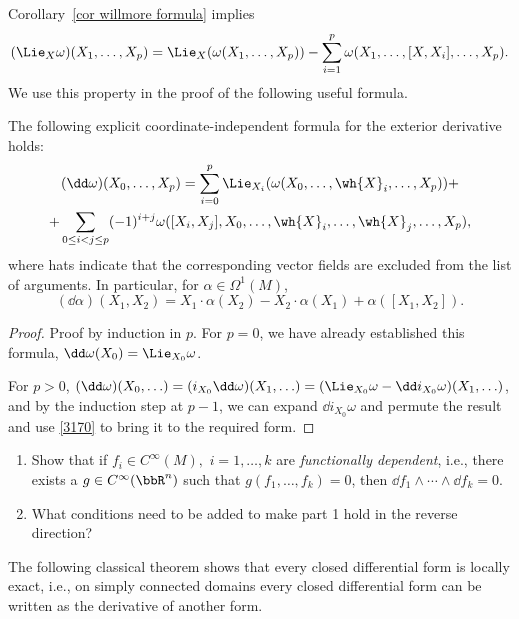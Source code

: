 Corollary~\ref{cor willmore formula} implies
\[(\Lie_X\omega) (X_1,\ldots,X_p)=\Lie_X(\omega(X_1,\ldots,X_p))-\sum_{i=1}^p\omega(X_1,\ldots,[X,X_i],\ldots,X_p).\label{3170}\]
We use this property in the proof of the following useful formula.

\begin{prop}[{{\cite[Prop.~4.1.6]{RS1}}}]\label{prop 4.1.6 RS1}
    The following explicit coordinate-independent formula for the exterior derivative holds:
    \begin{multline}
        (\dd\omega)(X_0,\ldots,X_{p})=\sum_{i=0}^p \Lie_{X_i}(\omega(X_0,\ldots,\wh{X}_i,\ldots,X_p))+\\+\sum_{0\leq i<j\leq p}(-1)^{i+j}\omega([X_i,X_j],X_0,\ldots,\wh{X}_i,\ldots,\wh{X}_j,\ldots,X_p),\label{eq d in terms of Lie}
    \end{multline}
    where hats indicate that the corresponding vector fields are excluded from the list of arguments. In particular, for $\alpha\in\Omega^1(M)$,
    \[(\dd\alpha)(X_1,X_2)=X_1\cdot \alpha(X_2)-X_2\cdot\alpha(X_1)+\alpha ([X_1,X_2]).\label{eq prop 4.1.6}\]
\end{prop}
\begin{proof}
Proof by induction in $p$. For $p=0$, we have already established this formula, $\dd \omega(X_0)=\Lie_{X_0}\omega$.

For $p>0$, $(\dd\omega)(X_0,\ldots )=(i_{X_0}\dd\omega)(X_1,\ldots)=(\Lie_{X_0}\omega-\dd i_{X_0}\omega)(X_1,\ldots)$, and by the induction step at $p-1$, we can expand $\dd i_{X_0}\omega$ and permute the result and use \eqref{3170} to bring it to the required form.
\end{proof}

\begin{xca}
    \begin{enumerate}
        \item Show that if $f_i\in C^\infty(M),$ $i=1,\ldots,k$ are \emph{functionally dependent}, i.e., there exists a $g\in C^\infty(\bbR^n)$ such that $g(f_1,\ldots,f_k)=0$, then $\dd f_1\wedge\cdots\wedge \dd f_k=0$.
        \item What conditions need to be added to make part 1 hold in the reverse direction?
    \end{enumerate}
\end{xca}

The following classical theorem shows that every closed differential form is locally exact, i.e., on simply connected domains every closed differential form can be written as the derivative of another form.


